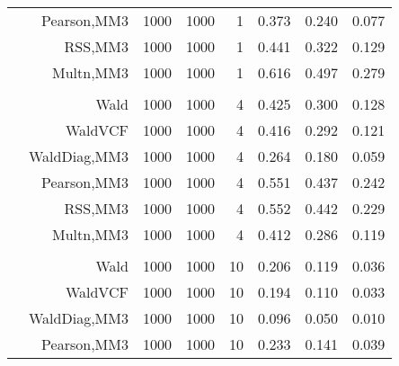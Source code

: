 \documentclass[
]{article}
\begin{document}
\begin{table}[H]
{\begin{tabular}[t]{lrrrrrrr}
\hspace{1em} & Pearson,MM3 & 1000 & 1000 & 1 & 0.373 & 0.240 & 0.077\\

\hspace{1em} & RSS,MM3 & 1000 & 1000 & 1 & 0.441 & 0.322 & 0.129\\

\hspace{1em} & Multn,MM3 & 1000 & 1000 & 1 & 0.616 & 0.497 & 0.279\\
\cmidrule{1-8}
\addlinespace[0.3em]
\multicolumn{8}{l}{\textbf{1F 15V}}\\
\hspace{1em} & Wald & 1000 & 1000 & 4 & 0.425 & 0.300 & 0.128\\

\hspace{1em} & WaldVCF & 1000 & 1000 & 4 & 0.416 & 0.292 & 0.121\\

\hspace{1em} & WaldDiag,MM3 & 1000 & 1000 & 4 & 0.264 & 0.180 & 0.059\\

\hspace{1em} & Pearson,MM3 & 1000 & 1000 & 4 & 0.551 & 0.437 & 0.242\\

\hspace{1em} & RSS,MM3 & 1000 & 1000 & 4 & 0.552 & 0.442 & 0.229\\

\hspace{1em} & Multn,MM3 & 1000 & 1000 & 4 & 0.412 & 0.286 & 0.119\\
\cmidrule{1-8}
\addlinespace[0.3em]
\multicolumn{8}{l}{\textbf{2F 10V}}\\
\hspace{1em} & Wald & 1000 & 1000 & 10 & 0.206 & 0.119 & 0.036\\

\hspace{1em} & WaldVCF & 1000 & 1000 & 10 & 0.194 & 0.110 & 0.033\\

\hspace{1em} & WaldDiag,MM3 & 1000 & 1000 & 10 & 0.096 & 0.050 & 0.010\\

\hspace{1em} & Pearson,MM3 & 1000 & 1000 & 10 & 0.233 & 0.141 & 0.039\\


\end{tabular}}
\end{table}
\end{document}
